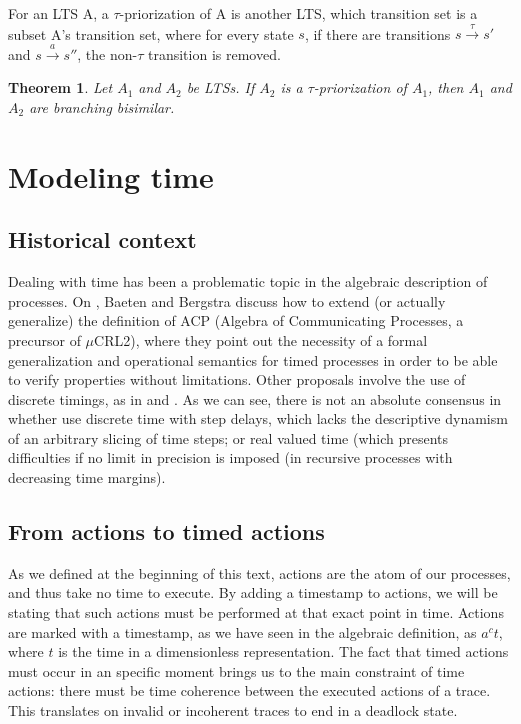\documentclass[11pt]{article}
\theoremstyle{definition}
\theoremstyle{plain}
\newtheorem{thm}{Theorem}[section]
\theoremstyle{definition}
\begin{document}
For an LTS A, a $ \tau $-priorization of A is another LTS, which transition set is a subset A's transition set, where for every state $ s $, if there are transitions $ s\xrightarrow{\tau}s' $ and $ s\xrightarrow{a}s'' $, the non-$ \tau $ transition is removed.

\begin{thm}
	Let $ A_1 $ and $ A_2 $ be LTSs. If $ A_2 $ is a $ \tau $-priorization of $ A_1 $, then $ A_1 $ and $ A_2 $ are branching bisimilar.
\end{thm}

\section{Modeling time}

\subsection{Historical context}
Dealing with time has been a problematic topic in the algebraic description of processes. On \cite{Baeten1991}, Baeten and Bergstra discuss how to extend (or actually generalize) the definition of ACP (Algebra of Communicating Processes, a precursor of $ \mu $CRL2), where they point out the necessity of a formal generalization and operational semantics for timed processes in order to be able to verify properties without limitations. Other proposals involve the use of discrete timings, as in \cite{hennessy1995process} and \cite{baeten1996discrete}. As we can see, there is not an absolute consensus in whether use discrete time with step delays, which lacks the descriptive dynamism of an arbitrary slicing of time steps; or real valued time (which presents difficulties if no limit in precision is imposed (in recursive processes with decreasing time margins).

\subsection{From actions to timed actions}

As we defined at the beginning of this text, actions are the atom of our processes, and thus take no time to execute. By adding a timestamp to actions, we will be stating that such actions must be performed at that exact point in time. Actions are marked with a timestamp, as we have seen in the algebraic definition, as $ a^c t $, where $ t $ is the time in a dimensionless representation. The fact that timed actions must occur in an specific moment brings us to the main constraint of time actions: there must be time coherence between the executed actions of a trace. This translates on invalid or incoherent traces to end in a deadlock state.
\end{document}
